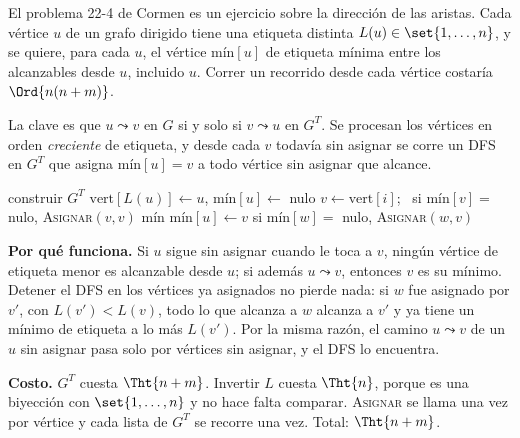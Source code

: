 \documentclass[11pt,letterpaper]{article}
\begin{document}
El problema 22-4 de Cormen es un ejercicio sobre la dirección de las
aristas. Cada vértice $u$ de un grafo dirigido tiene una etiqueta
distinta $L(u) \in \set{1, \dots, n}$, y se quiere, para cada $u$, el
vértice $\text{mín}[u]$ de etiqueta mínima entre los alcanzables desde
$u$, incluido $u$. Correr un recorrido desde cada vértice costaría
$\Ord{n(n + m)}$.

La clave es que $u \leadsto v$ en $G$ si y solo si $v \leadsto u$ en
$G^T$. Se procesan los vértices en orden \emph{creciente} de etiqueta,
y desde cada $v$ todavía sin asignar se corre un DFS en $G^T$ que
asigna $\text{mín}[u] = v$ a todo vértice sin asignar que alcance.

\begin{algorithm}[H]
\caption{\textsc{Mínimos-Alcanzables}$(G, L)$, problema 22-4}
\label{alg:minimos-alcanzables}
\begin{algorithmic}[1]
  \State construir $G^T$
    \State $\text{vert}[L(u)] \gets u$, \quad
           $\text{mín}[u] \gets$ nulo
  \EndFor
    \State $v \gets \text{vert}[i]$; \ si $\text{mín}[v] =$ nulo,
           \textsc{Asignar}$(v, v)$
  \EndFor
  \State \Return $\text{mín}$
\EndProcedure
\Statex
{} 
  \State $\text{mín}[u] \gets v$
    \State si $\text{mín}[w] =$ nulo, \textsc{Asignar}$(w, v)$
  \EndFor
\EndProcedure
\end{algorithmic}
\end{algorithm}

\textbf{Por qué funciona.} Si $u$ sigue sin asignar cuando le toca a
$v$, ningún vértice de etiqueta menor es alcanzable desde $u$; si
además $u \leadsto v$, entonces $v$ es su mínimo. Detener el DFS en los
vértices ya asignados no pierde nada: si $w$ fue asignado por $v'$, con
$L(v') < L(v)$, todo lo que alcanza a $w$ alcanza a $v'$ y ya tiene un
mínimo de etiqueta a lo más $L(v')$. Por la misma razón, el camino
$u \leadsto v$ de un $u$ sin asignar pasa solo por vértices sin
asignar, y el DFS lo encuentra.

\textbf{Costo.} $G^T$ cuesta $\Tht{n + m}$. Invertir $L$ cuesta
$\Tht{n}$, porque es una biyección con $\set{1, \dots, n}$ y no hace
falta comparar. \textsc{Asignar} se llama una vez por vértice y cada
lista de $G^T$ se recorre una vez. Total: $\Tht{n + m}$.
\end{document}
